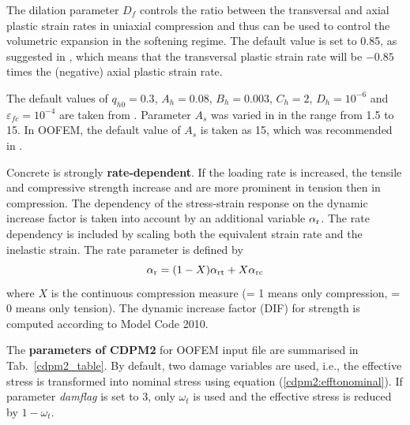 \documentclass[a4paper]{article}
\begin{document}
The dilation parameter $D_f$ controls the ratio between the transversal
and axial plastic strain rates in uniaxial compression and thus can
be used to control the volumetric expansion in the softening regime.
The default value is set to 0.85, as suggested in \cite{GraJir},
which means that the transversal plastic strain rate will be $-0.85$ times the (negative) axial plastic strain rate. 

The default values of $q_{h0}=0.3$, $A_h=0.08$, $B_h=0.003$, $C_h=2$, $D_h=10^{-6}$
and $\varepsilon_{fc}=10^{-4}$ are taken from \cite{GraXenNys13}.
Parameter $A_s$ was varied in \cite{GraXenNys13}
in the range from 1.5 to 15. In OOFEM, the default value of $A_s$ is taken as 15, which was recommended in \cite{GraJir}.

Concrete is strongly {\bf rate-dependent}. If the loading rate is increased, the tensile and compressive strength increase and are more prominent in tension then in compression. The dependency of the stress-strain response on the dynamic increase factor is taken into account by an additional variable $\alpha_{\rm r}$. The rate dependency is included by scaling both the equivalent strain rate and the inelastic strain. The rate parameter is defined by
\begin{equation}
\alpha_{\rm r}=(1-X) \alpha_{\rm rt} + X  \alpha_{\rm rc}
\end{equation}
where $X$ is the continuous compression measure (= 1 means only compression, = 0 means only tension).
The dynamic increase factor (DIF) for strength is computed according to Model Code 2010.  

The {\bf parameters of CDPM2} for OOFEM input file are summarised in Tab.~\ref{cdpm2_table}.
By default, two damage variables are used, i.e., the effective stress is transformed into
nominal stress using equation (\ref{cdpm2:efftonominal}). If parameter {\em damflag} is set to 3,
only $\omega_t$ is used and the effective stress is reduced by $1-\omega_t$.
\end{document}
